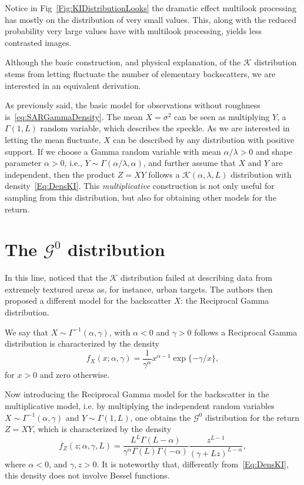 Notice in Fig~\ref{Fig:KIDistributionLooks} the dramatic effect multilook processing has mostly on the distribution of very small values.
This, along with the reduced probability very large values have with multilook processing, yields less contrasted images.

Although the basic construction, and physical explanation, of the $\mathcal K$ distribution stems from letting fluctuate the number of elementary backscatters, we are interested in an equivalent derivation.

As previously said, the basic model for observations without roughness is~\eqref{eq:SARGammaDensity}.
The mean $X=\sigma^2$ can be seen as multiplying $Y$, a $\Gamma(1,L)$ random variable, which describes the speckle.
As we are interested in letting the mean fluctuate, $X$ can be described by any distribution with positive support.
If we choose a Gamma random variable with mean $\alpha/\lambda>0$ and shape parameter $\alpha>0$, i.e., $Y\sim\Gamma(\alpha/\lambda,\alpha)$, and further assume that $X$ and $Y$ are independent, then the product $Z=XY$ follows a $\mathcal{K}(\alpha,\lambda,L)$ distribution with density~\eqref{Eq:DensKI}.
This \textit{multiplicative} construction is not only useful for sampling from this distribution, but also for obtaining other models for the return.

\section{The $\mathcal G^0$ distribution}

In this line, \citet{frery96} noticed that the $\mathcal{K}$ distribution failed at describing data from extremely textured areas as, for instance, urban targets.
The authors then proposed a different model for the backscatter $X$: the Reciprocal Gamma distribution.

We say that $X\sim{\Gamma^{-1}}(\alpha,\gamma)$, with $\alpha<0$ and $\gamma>0$ follows a 
Reciprocal Gamma distribution is characterized by the density
\begin{equation}
f_X(x;\alpha,\gamma) = \frac{1}{\gamma^\alpha} x^{\alpha-1} \exp\{-\gamma/x\},
\label{Eq:IGdensity}
\end{equation}
for $x>0$ and zero otherwise.

Now introducing the Reciprocal Gamma model for the backscatter in the multiplicative model, i.e. by multiplying the independent random variables $X\sim{\Gamma^{-1}}(\alpha,\gamma)$ and $Y\sim\Gamma(1,L)$, one obtains the $\mathcal{G}^0$ distribution for the return $Z=XY$, which is characterized by the density
\begin{equation}
f_Z(z; \alpha,\gamma,L) = \frac{L^L \Gamma(L-\alpha)}{\gamma^\alpha \Gamma(L)\Gamma(-\alpha)} \frac{z^{L-1}}{(\gamma+L z)^{L-\alpha}},
\label{Eq:DensGI0}
\end{equation}
where $\alpha<0$, and $\gamma,z>0$.
It is noteworthy that, differently from~\eqref{Eq:DensKI}, this density does not involve Bessel functions.

